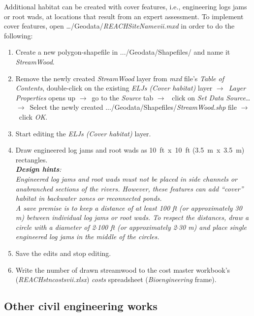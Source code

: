 Additional habitat can be created with cover features, i.e., engineering logs jams or root wads, at locations that result from an expert assessment. To implement cover features, open \ldots{}/Geodata/\emph{REACH{\myUnderscore}SiteName{\myUnderscore}vii.mxd} in order to do the following:

\begin{enumerate}
\def\labelenumi{\arabic{enumi})}
\item Create a new polygon-shapefile in .../Geodata/Shapefiles/ and name it \emph{StreamWood}.
\item Remove the newly created \emph{StreamWood} layer from \emph{mxd} file's \emph{Table of Contents}, double-click on the existing \emph{ELJs (Cover habitat)} layer $\rightarrow$~\emph{Layer Properties} opens up $\rightarrow$~go to the \emph{Source} tab $\rightarrow$~ click on \emph{Set Data Source}\ldots{} $\rightarrow$~Select the newly created .../Geodata/Shapefiles/\emph{StreamWood.shp} file $\rightarrow$~click \emph{OK}. 
\item Start editing the \emph{ELJs (Cover habitat)} layer. 
\item Draw engineered log jams and root wads as 10~ft~x~10~ft (3.5~m~x~3.5~m) rectangles.\\
  \emph{\textbf{Design hints}: }\\
  \emph{Engineered log jams and root wads must not be placed in side channels or anabranched sections of the rivers. However, these features can add ``cover'' habitat in backwater zones or reconnected ponds.}\\
  \emph{A save premise is to keep a distance of at least 100 ft (or approximately 30 m) between individual log jams or root wads. To respect the distances, draw a circle with a diameter of 2$\cdot$100 ft (or approximately 2$\cdot$30 m) and place single engineered log jams in the middle of the circles.}
\item Save the edits and stop editing.
\item Write the number of drawn streamwood to the cost master workbook's (\emph{REACH{\myUnderscore}stn{\myUnderscore}costs{\myUnderscore}vii.xlsx}) \emph{costs} spreadsheet (\emph{Bioengineering} frame).
\end{enumerate}

\subsection{Other civil engineering works}

